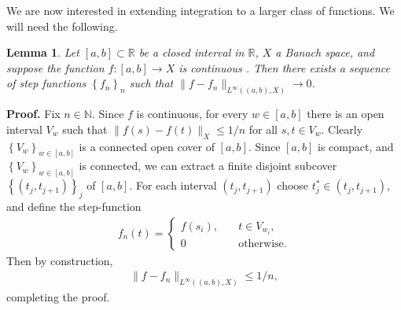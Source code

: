 \documentclass[12pt,reqno]{amsart}
\numberwithin{equation}{section}  %
\numberwithin{figure}{section}
\newcommand{\rr}{\mathbb{R}}
\theoremstyle{plain}
\newtheorem{lemma}{Lemma}
\theoremstyle{definition}
\theoremstyle{remark}
\begin{document}
%
%
We are now interested in extending integration to a larger class of functions. We will need the
following. %
%
\begin{lemma}
	\label{lem:dense}
	Let $[a, b] \subset \rr$ be a closed interval in $\rr$, $X$ a Banach space, and
	suppose the function $f:[a,b] \to X$ is continuous . Then
	there exists a sequence of step functions $\left\{ f_n \right\}_n$
	such that $\|f - f_n\|_{L^\infty( (a,b), X)} \to 0$. 
\end{lemma}
%
%
{\bf Proof.} Fix $n \in \mathbb{N}$. Since $f$ is continuous, for every $w \in
\left[ a,b \right]$ there is an open interval $V_w$ such that $\|f(s) - f(t)
\|_X \le 1/n$ for all $s, t \in V_w$. Clearly $\left\{ V_w \right\}_{w \in
\left[ a,b \right]}$ is a connected
open cover of $[a,b]$. Since $[a,b]$ is compact, and $\left\{ V_w \right\}_{w \in
\left[ a,b \right]}$ is connected, we
can extract
a finite disjoint subcover $\left\{ (t_j, t_{j +1}) \right\}_j$ of $[a,b]$. For
each interval $(t_j, t_{j +1})$
choose $t_{j}^* \in (t_{j}, t_{j +1})$, and define the step-function
%
%
\begin{equation*}
	\begin{split}
		f_n(t) =
		\begin{cases}
		f(s_i), \quad & t \in V_{w_i},
		\\
		0 & \text{otherwise}.
	\end{cases}
	\end{split}
\end{equation*}
%
%
Then by construction, 
%
%
\begin{equation*}
	\begin{split}
		\|f-f_n\|_{L^\infty( (a,b), X)} \le 1/n,
	\end{split}
\end{equation*}
%
%
completing the proof. \qquad \qedsymbol
%
%
%
%
%
%
%
%
%
%
%
%
%
\end{document}
